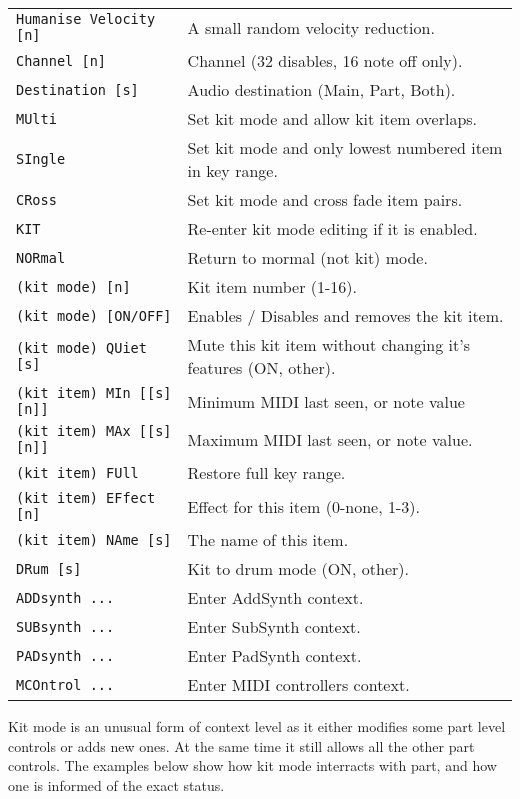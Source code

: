 \begin{table}[H]
\begin{tabular}{l l}
\texttt{Humanise Velocity [n]} &
   A small random velocity reduction. \\
\texttt{Channel [n]} &
   Channel (32 disables, 16 note off only).   \\
\texttt{Destination [s]} &
   Audio destination (Main, Part, Both).  \\
\texttt{MUlti} &
   Set kit mode and allow kit item overlaps. \\
\texttt{SIngle} &
   Set kit mode and only lowest numbered item in key range. \\
\texttt{CRoss} &
   Set kit mode and cross fade item pairs. \\
\texttt{KIT} &
   Re-enter kit mode editing if it is enabled. \\
\texttt{NORmal} &
   Return to mormal (not kit) mode. \\
   \texttt{(kit mode) [n]} &
      Kit item number (1-16). \\
   \texttt{(kit mode) [ON/OFF]} &
      Enables / Disables and removes the kit item. \\
   \texttt{(kit mode) QUiet [s]} &
      Mute this kit item without changing it's features (ON, {other}). \\
   \texttt{(kit item) MIn [[s][n]]} &
      Minimum MIDI last seen, or note value   \\
   \texttt{(kit item) MAx [[s][n]]} &
      Maximum MIDI last seen, or note value.   \\
   \texttt{(kit item) FUll} &
      Restore full key range.   \\
   \texttt{(kit item) EFfect [n]} &
      Effect for this item (0-none, 1-3). \\
   \texttt{(kit item) NAme [s]} &
      The name of this item. \\
    \texttt{DRum [s]} &
      Kit to drum mode (ON, {other}). \\
\texttt{ADDsynth ...} &
   Enter AddSynth context. \\
\texttt{SUBsynth ...} &
   Enter SubSynth context. \\
\texttt{PADsynth ...} &
   Enter PadSynth context. \\
\texttt{MCOntrol ...} &
   Enter MIDI controllers context. \\
      \end{tabular}
   \end{table}

   Kit mode is an unusual form of context level as it either modifies some
   part level controls or adds new ones. At the same time it still allows
   all the other part controls. The examples below show how kit mode
   interracts with part, and how one is informed of the exact status.

